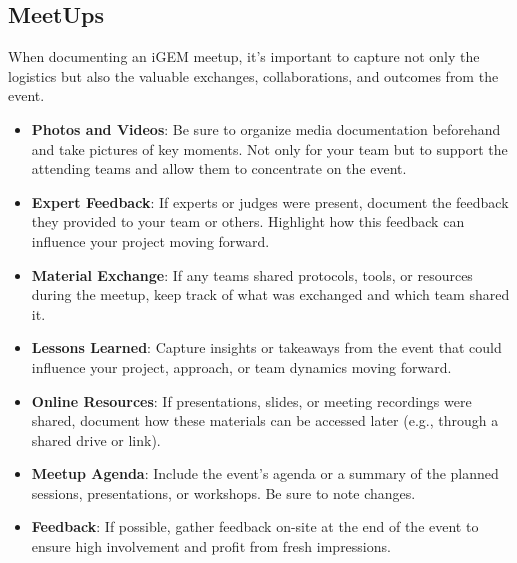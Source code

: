 \subsection{MeetUps} \label{subsec:meetups} 
When documenting an iGEM meetup, it's important to capture not only the logistics but also the valuable exchanges, collaborations, and outcomes from the event.
\begin{itemize}
    \item \textbf{Photos and Videos}: Be sure to organize media documentation beforehand and take pictures of key moments.
    Not only for your team but to support the attending teams and allow them to concentrate on the event.
    \item \textbf{Expert Feedback}: If experts or judges were present, document the feedback they provided to your team or others.
    Highlight how this feedback can influence your project moving forward.
    \item \textbf{Material Exchange}: If any teams shared protocols, tools, or resources during the meetup, keep track of what was exchanged and which team shared it.
    \item \textbf{Lessons Learned}: Capture insights or takeaways from the event that could influence your project, approach, or team dynamics moving forward.
    \item \textbf{Online Resources}: If presentations, slides, or meeting recordings were shared, document how these materials can be accessed later (e.g., through a shared drive or link).
    \item \textbf{Meetup Agenda}: Include the event’s agenda or a summary of the planned sessions, presentations, or workshops.
    Be sure to note changes.
    \item \textbf{Feedback}: If possible, gather feedback on-site at the end of the event to ensure high involvement and profit from fresh impressions.
\end{itemize}
